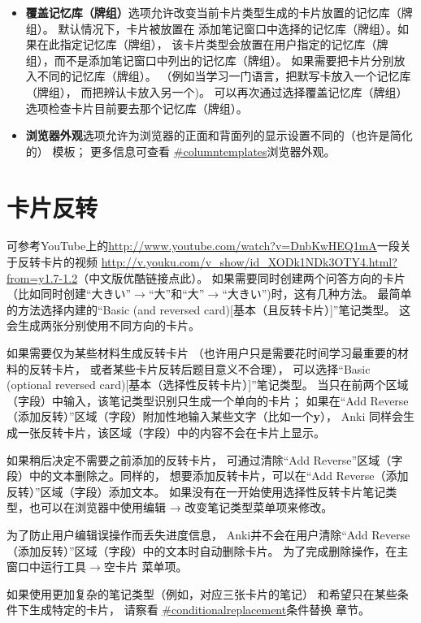 \documentclass[a4paper]{book}
\begin{document}
	\begin{itemize}
		\itemsep1pt\parskip0pt
		\item \textbf{覆盖记忆库（牌组）}选项允许改变当前卡片类型生成的卡片放置的记忆库（牌组）。 默认情况下，卡片被放置在 添加笔记窗口中选择的记忆库（牌组）。如果在此指定记忆库（牌组）， 该卡片类型会放置在用户指定的记忆库（牌组），而不是添加笔记窗口中列出的记忆库（牌组）。 如果需要把卡片分别放入不同的记忆库（牌组）。 （例如当学习一门语言，把默写卡放入一个记忆库（牌组）， 而把辨认卡放入另一个)。 可以再次通过选择覆盖记忆库（牌组）选项检查卡片目前要去那个记忆库（牌组）。
		\item \textbf{浏览器外观}选项允许为浏览器的正面和背面列的显示设置不同的（也许是简化的） 模板； 更多信息可查看
		\url{#columntemplates}浏览器外观。
	\end{itemize}
	\section{卡片反转}
	可参考YouTube上的\url{http://www.youtube.com/watch?v=DnbKwHEQ1mA}一段关于反转卡片的视频
	\url{http://v.youku.com/v_show/id_XODk1NDk3OTY4.html?from=y1.7-1.2}（中文版优酷链接点此）。
	如果需要同时创建两个问答方向的卡片 （比如同时创建“大きい”$\to$“大”和“大”$\to$“大きい”)时，这有几种方法。 最简单的方法选择内建的“Basic (and reversed card)[基本（且反转卡片）]”笔记类型。 这会生成两张分别使用不同方向的卡片。
	
	如果需要仅为某些材料生成反转卡片 （也许用户只是需要花时间学习最重要的材料的反转卡片， 或者某些卡片反转后题目意义不合理）， 可以选择“Basic (optional reversed card)[基本（选择性反转卡片）]”笔记类型。 当只在前两个区域（字段）中输入，该笔记类型识别只生成一个单向的卡片； 如果在“Add Reverse（添加反转）”区域（字段）附加性地输入某些文字（比如一个\textbf{y}）， Anki 同样会生成一张反转卡片，该区域（字段）中的内容不会在卡片上显示。
	
	如果稍后决定不需要之前添加的反转卡片， 可通过清除“Add Reverse”区域（字段）中的文本删除之。同样的， 想要添加反转卡片，可以在“Add Reverse（添加反转）”区域（字段）添加文本。 如果没有在一开始使用选择性反转卡片笔记类型，也可以在浏览器中使用编辑 → 改变笔记类型菜单项来修改。
	
\begin{shaded}
	为了防止用户编辑误操作而丢失进度信息， Anki并不会在用户清除“Add Reverse（添加反转）”区域（字段）中的文本时自动删除卡片。 为了完成删除操作，在主窗口中运行工具$\to$空卡片
	菜单项。
\end{shaded}
	
	如果使用更加复杂的笔记类型（例如，对应三张卡片的笔记） 和希望只在某些条件下生成特定的卡片， 请察看 \url{#conditionalreplacement}条件替换 章节。
\end{document}
